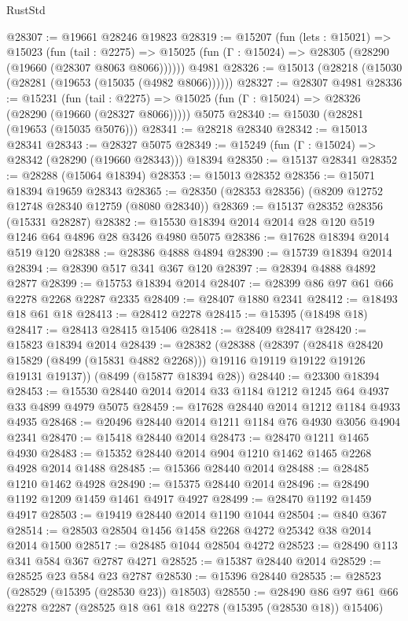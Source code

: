 \begin{lexlean}{RustStd}
\begin{coremodule}
@28307 := @19661 @28246 @19823
@28319 := @15207
    (fun (lets : @15021) =>
    @15023
      (fun (tail : @2275) =>
      @15025 (fun (Γ : @15024) => @28305 (@28290 (@19660 (@28307 @8063 @8066))))))
    @4981
@28326 := @15013 (@28218 (@15030 (@28281 (@19653 (@15035 (@4982 @8066))))))
@28327 := @28307 @4981
@28336 := @15231
    (fun (tail : @2275) => @15025 (fun (Γ : @15024) => @28326 (@28290 (@19660 (@28327 @8066)))))
    @5075
@28340 := @15030 (@28281 (@19653 (@15035 @5076)))
@28341 := @28218 @28340
@28342 := @15013 @28341
@28343 := @28327 @5075
@28349 := @15249 (fun (Γ : @15024) => @28342 (@28290 (@19660 @28343))) @18394
@28350 := @15137 @28341
@28352 := @28288 (@15064 @18394)
@28353 := @15013 @28352
@28356 := @15071 @18394 @19659 @28343
@28365 := @28350 (@28353 @28356) (@8209 @12752 @12748 @28340 @12759 (@8080 @28340))
@28369 := @15137 @28352 @28356 (@15331 @28287)
@28382 := @15530 @18394 @2014 @2014 @28 @120 @519 @1246 @64 @4896 @28 @3426 @4980 @5075
@28386 := @17628 @18394 @2014 @519 @120
@28388 := @28386 @4888 @4894
@28390 := @15739 @18394 @2014
@28394 := @28390 @517 @341 @367 @120
@28397 := @28394 @4888 @4892 @2877
@28399 := @15753 @18394 @2014
@28407 := @28399 @86 @97 @61 @66 @2278 @2268 @2287 @2335
@28409 := @28407 @1880 @2341
@28412 := @18493 @18 @61 @18
@28413 := @28412 @2278
@28415 := @15395 (@18498 @18)
@28417 := @28413 @28415 @15406
@28418 := @28409 @28417
@28420 := @15823 @18394 @2014
@28439 := @28382
    (@28388
      (@28397
        (@28418 @28420 @15829 (@8499 (@15831 @4882 @2268)))
        @19116
        @19119
        @19122
        @19126
        @19131
        @19137))
    (@8499 (@15877 @18394 @28))
@28440 := @23300 @18394
@28453 := @15530 @28440 @2014 @2014 @33 @1184 @1212 @1245 @64 @4937 @33 @4899 @4979 @5075
@28459 := @17628 @28440 @2014 @1212 @1184 @4933 @4935
@28468 := @20496 @28440 @2014 @1211 @1184 @76 @4930 @3056 @4904 @2341
@28470 := @15418 @28440 @2014
@28473 := @28470 @1211 @1465 @4930
@28483 := @15352 @28440 @2014 @904 @1210 @1462 @1465 @2268 @4928 @2014 @1488
@28485 := @15366 @28440 @2014
@28488 := @28485 @1210 @1462 @4928
@28490 := @15375 @28440 @2014
@28496 := @28490 @1192 @1209 @1459 @1461 @4917 @4927
@28499 := @28470 @1192 @1459 @4917
@28503 := @19419 @28440 @2014 @1190 @1044
@28504 := @840 @367
@28514 := @28503 @28504 @1456 @1458 @2268 @4272 @25342 @38 @2014 @2014 @1500
@28517 := @28485 @1044 @28504 @4272
@28523 := @28490 @113 @341 @584 @367 @2787 @4271
@28525 := @15387 @28440 @2014
@28529 := @28525 @23 @584 @23 @2787
@28530 := @15396 @28440
@28535 := @28523 (@28529 (@15395 (@28530 @23)) @18503)
@28550 := @28490 @86 @97 @61 @66 @2278 @2287 (@28525 @18 @61 @18 @2278 (@15395 (@28530 @18)) @15406)

\end{coremodule}
\end{lexlean}
